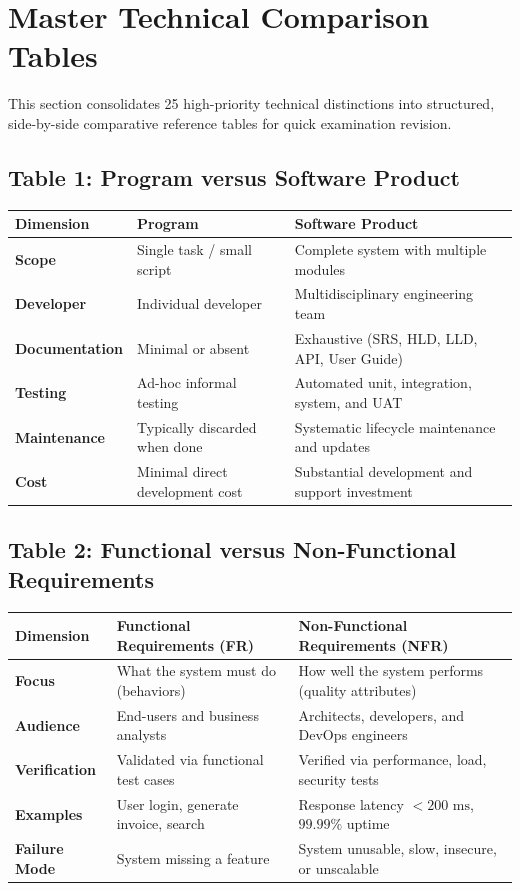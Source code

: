 \section{Master Technical Comparison Tables}
\label{sec:se_comparison_tables}

This section consolidates 25 high-priority technical distinctions into structured, side-by-side comparative reference tables for quick examination revision.

\subsection*{Table 1: Program versus Software Product}
\begin{center}
\small
\begin{tabularx}{\textwidth}{lXX}
\toprule
\textbf{Dimension} & \textbf{Program} & \textbf{Software Product} \\
\midrule
\textbf{Scope} & Single task / small script & Complete system with multiple modules \\
\textbf{Developer} & Individual developer & Multidisciplinary engineering team \\
\textbf{Documentation} & Minimal or absent & Exhaustive (SRS, HLD, LLD, API, User Guide) \\
\textbf{Testing} & Ad-hoc informal testing & Automated unit, integration, system, and UAT \\
\textbf{Maintenance} & Typically discarded when done & Systematic lifecycle maintenance and updates \\
\textbf{Cost} & Minimal direct development cost & Substantial development and support investment \\
\bottomrule
\end{tabularx}
\end{center}

\subsection*{Table 2: Functional versus Non-Functional Requirements}
\begin{center}
\small
\begin{tabularx}{\textwidth}{lXX}
\toprule
\textbf{Dimension} & \textbf{Functional Requirements (FR)} & \textbf{Non-Functional Requirements (NFR)} \\
\midrule
\textbf{Focus} & What the system must do (behaviors) & How well the system performs (quality attributes) \\
\textbf{Audience} & End-users and business analysts & Architects, developers, and DevOps engineers \\
\textbf{Verification} & Validated via functional test cases & Verified via performance, load, security tests \\
\textbf{Examples} & User login, generate invoice, search & Response latency $<200\text{ ms}$, $99.99\%$ uptime \\
\textbf{Failure Mode} & System missing a feature & System unusable, slow, insecure, or unscalable \\
\bottomrule
\end{tabularx}
\end{center}

